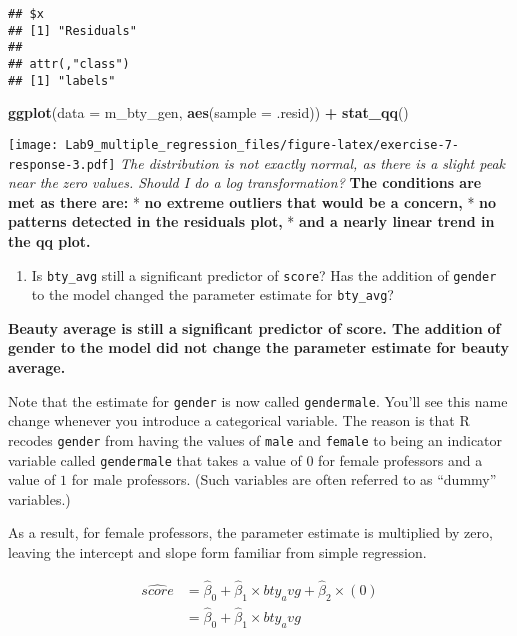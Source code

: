 \documentclass[
]{article}
\newenvironment{Shaded}{\begin{snugshade}}{\end{snugshade}}
\newcommand{\AttributeTok}[1]{\textcolor[rgb]{0.13,0.29,0.53}{#1}}
\newcommand{\FunctionTok}[1]{\textcolor[rgb]{0.13,0.29,0.53}{\textbf{#1}}}
\newcommand{\NormalTok}[1]{#1}
\newcommand{\SpecialCharTok}[1]{\textcolor[rgb]{0.81,0.36,0.00}{\textbf{#1}}}
\providecommand{\tightlist}{%
  \setlength{\itemsep}{0pt}\setlength{\parskip}{0pt}}
\begin{document}
\begin{verbatim}
## $x
## [1] "Residuals"
## 
## attr(,"class")
## [1] "labels"
\end{verbatim}

\begin{Shaded}
\begin{Highlighting}[]
\FunctionTok{ggplot}\NormalTok{(}\AttributeTok{data =}\NormalTok{ m\_bty\_gen, }\FunctionTok{aes}\NormalTok{(}\AttributeTok{sample =}\NormalTok{ .resid)) }\SpecialCharTok{+}
  \FunctionTok{stat\_qq}\NormalTok{()}
\end{Highlighting}
\end{Shaded}

\texttt{[image: Lab9\_multiple\_regression\_files/figure-latex/exercise-7-response-3.pdf]}
\emph{The distribution is not exactly normal, as there is a slight peak
near the} \emph{zero values. Should I do a log transformation?}
\textbf{The conditions are met as there are:} * \textbf{no extreme
outliers that would be a concern,} * \textbf{no patterns detected in the
residuals plot,} * \textbf{and a nearly linear trend in the qq plot.}

\begin{enumerate}
\def\labelenumi{\arabic{enumi}.}
\setcounter{enumi}{7}
\tightlist
\item
  Is \texttt{bty\_avg} still a significant predictor of \texttt{score}?
  Has the addition of \texttt{gender} to the model changed the parameter
  estimate for \texttt{bty\_avg}?
\end{enumerate}

\textbf{Beauty average is still a significant predictor of score. The
addition} \textbf{of gender to the model did not change the parameter
estimate for beauty} \textbf{average.}

Note that the estimate for \texttt{gender} is now called
\texttt{gendermale}. You'll see this name change whenever you introduce
a categorical variable. The reason is that R recodes \texttt{gender}
from having the values of \texttt{male} and \texttt{female} to being an
indicator variable called \texttt{gendermale} that takes a value of
\(0\) for female professors and a value of \(1\) for male professors.
(Such variables are often referred to as ``dummy'' variables.)

As a result, for female professors, the parameter estimate is multiplied
by zero, leaving the intercept and slope form familiar from simple
regression.

\[
  \begin{aligned}
\widehat{score} &= \hat{\beta}_0 + \hat{\beta}_1 \times bty_avg + \hat{\beta}_2 \times (0) \\
&= \hat{\beta}_0 + \hat{\beta}_1 \times bty_avg\end{aligned}
\]
\end{document}
